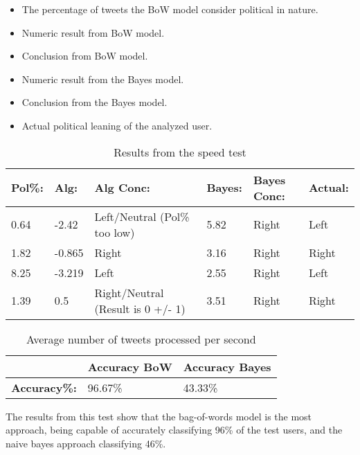 \begin{itemize}
  \item The percentage of tweets the BoW model
consider political in nature.
\item Numeric result from BoW model.
\item Conclusion from BoW model.
\item Numeric result from the Bayes model.
\item Conclusion from the Bayes model.
\item Actual political leaning of the analyzed user.
\end{itemize}

\begin{table}[H]\centering
\begin{tabular}{|l|l|l|l|l|l|}
\hline
\textbf{Pol\%:}	&	\textbf{Alg:}	&	\textbf{Alg Conc:}							&	\textbf{Bayes:}	&
\textbf{Bayes Conc:}
& \textbf{Actual:}
\\\hline 0.64	&	-2.42	&	Left/Neutral (Pol\% too low)		&	5.82	&	Right		&	Left	\\\hline
1.82	&	-0.865	&	Right								&	3.16	&	Right		&	Right	\\\hline
8.25	&	-3.219	&	Left								&	2.55	&	Right		&	Left	\\\hline
1.39	&	0.5		&	Right/Neutral (Result is 0 +/- 1)	&	3.51	&	Right		&	Right	\\\hline
\end{tabular}
\caption{Results from the speed test}
\label{speedTestReslabel}
\end{table}

\begin{table}[H]\centering
\begin{tabular}{|l|l|l|}\hline
						&	\textbf{Accuracy BoW}	&	\textbf{Accuracy Bayes}	\\\hline
\textbf{Accuracy\%:}	&	96.67\%					&	43.33\%						\\\hline	
\end{tabular}
\caption{Average number of tweets processed per second}
\label{AccPercent}
\end{table}

The results from this test show that the bag-of-words model is the most
approach, being capable of accurately classifying 96\% of the test users, and
the naive bayes approach classifying 46\%.













